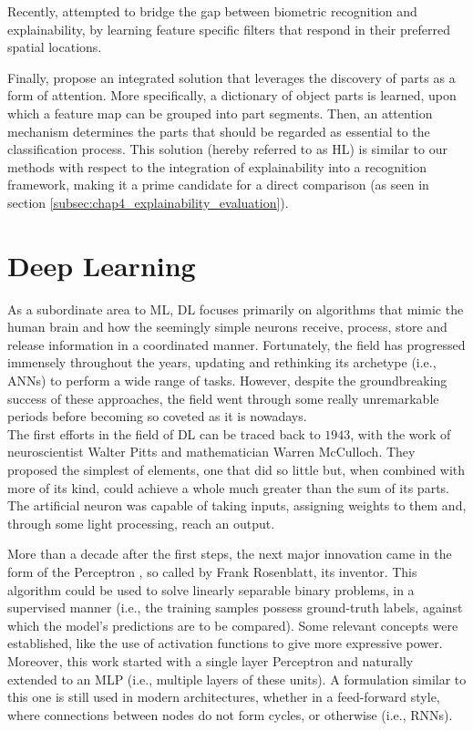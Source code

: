 Recently, \cite{towards_interpretable_face_recognition} attempted to bridge the gap between biometric recognition and explainability, by learning feature specific filters that respond in their preferred spatial locations. 

Finally, \cite{interpretability_by_parts} propose an integrated solution that leverages the discovery of parts as a form of attention. More specifically, a dictionary of object parts is learned, upon which a feature map can be grouped into part segments. Then, an attention mechanism determines the parts that should be regarded as essential to the classification process. This solution (hereby referred to as HL) is similar to our methods with respect to the integration of explainability into a recognition framework, making it a prime candidate for a direct comparison (as seen in section \ref{subsec:chap4_explainability_evaluation}).

\section{Deep Learning}
\label{sec:chap2_deep_learning}

As a subordinate area to \ac{ML}, \ac{DL} focuses primarily on algorithms that mimic the human brain and how the seemingly simple neurons receive, process, store and release information in a coordinated manner.  Fortunately, the field has progressed immensely throughout the years, updating and rethinking its archetype (i.e., \ac{ANN}s) to perform a wide range of tasks. However, despite the groundbreaking success of these approaches, the field went through some really unremarkable periods before becoming so coveted as it is nowadays.\\

The first efforts in the field of \ac{DL} can be traced back to $1943$, with the work of neuroscientist Walter Pitts and mathematician Warren McCulloch. They proposed the simplest of elements, one that did so little but, when combined with more of its kind, could achieve a whole much greater than the sum of its parts. The artificial neuron was capable of taking inputs, assigning weights to them and, through some light processing, reach an output.

More than a decade after the first steps, the next major innovation came in the form of the Perceptron \cite{perceptron}, so called by Frank Rosenblatt, its inventor. This algorithm could be used to solve linearly separable binary problems, in a supervised manner (i.e., the training samples possess ground-truth labels, against which the model's predictions are to be compared). Some relevant concepts were established, like the use of activation functions to give more expressive power.
Moreover, this work started with a single layer Perceptron and naturally extended to an \ac{MLP} (i.e., multiple layers of these units). A formulation similar to this one is still used in modern architectures, whether in a feed-forward style, where connections between nodes do not form cycles, or otherwise (i.e., \ac{RNN}s).

